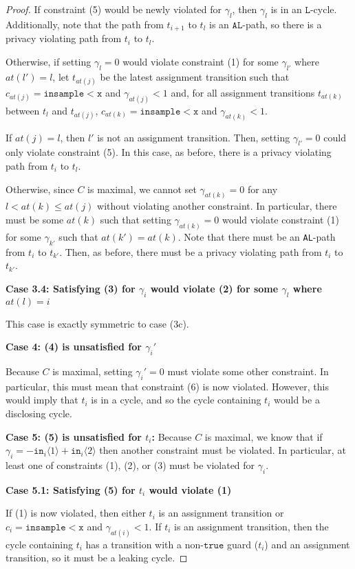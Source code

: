 \documentclass[12pt]{article}
\newcommand{\lguard}[1][x]{\texttt{insample} < #1}
\newcommand{\brangle}[1]{\langle #1 \rangle}
\theoremstyle{definition}
\begin{document}
\begin{proof}
    If constraint (5) would be newly violated for $\gamma_l$, then $\gamma_l$ is in an $\texttt{L}$-cycle. Additionally, note that the path from $t_{i+1}$ to $t_l$ is an $\texttt{AL}$-path, so there is a privacy violating path from $t_i$ to $t_l$. 

    Otherwise, if setting $\gamma_l = 0$ would violate constraint (1) for some $\gamma_{l'}$ where $at(l')=l$, let $t_{at(j)}$ be the latest assignment transition such that $c_{at(j)} = \lguard[\texttt{x}]$ and $\gamma_{at(j)}<1$ and, for all assignment transitions $t_{at(k)}$ between $t_l$ and $t_{at(j)}$, $c_{at(k)} = \lguard[\texttt{x}]$ and $\gamma_{at(k)}<1$. 

    If $at(j) = l$, then $l'$ is not an assignment transition. Then, setting $\gamma_{l'} = 0$ could only violate constraint (5). In this case, as before, there is a privacy violating path from $t_i$ to $t_l$. 

    Otherwise, since $C$ is maximal, we cannot set $\gamma_{at(k)}=0$ for any $l<at(k)\leq at(j)$ without violating another constraint. In particular, there must be some $at(k)$ such that setting $\gamma_{at(k)} = 0$ would violate constraint (1) for some $\gamma_{k'}$ such that $at(k') = at(k)$. Note that there must be an \texttt{AL}-path from $t_i$ to $t_{k'}$. Then, as before, there must be a privacy violating path from $t_i$ to $t_{k'}$. 


    \textbf{Case 3.4: Satisfying (3) for $\gamma_i$ would violate (2) for some $\gamma_l$ where $at(l) = i$} 

    This case is exactly symmetric to case (3c).

    \textbf{Case 4: (4) is unsatisfied for $\gamma_i'$}
    
    Because $C$ is maximal, setting $\gamma_i'=0$ must violate some other constraint. In particular, this must mean that constraint (6) is now violated. However, this would imply that $t_i$ is in a cycle, and so the cycle containing $t_i$ would be a disclosing cycle.

    \textbf{Case 5: (5) is unsatisfied for $t_i$:} Because $C$ is maximal, we know that if $\gamma_i = -\texttt{in}_i\brangle{1}+\texttt{in}_i\brangle{2}$ then another constraint must be violated. In particular, at least one of constraints (1), (2), or (3) must be violated for $\gamma_i$. 
    
    \textbf{Case 5.1: Satisfying (5) for $t_i$ would violate (1)}

    If (1) is now violated, then either $t_i$ is an assignment transition or $c_i = \lguard[\texttt{x}]$ and $\gamma_{at(i)}<1$. If $t_i$ is an assignment transition, then the cycle containing $t_i$ has a transition with a non-$\texttt{true}$ guard ($t_i$) and an assignment transition, so it must be a leaking cycle. 


\end{proof}
\end{document}

